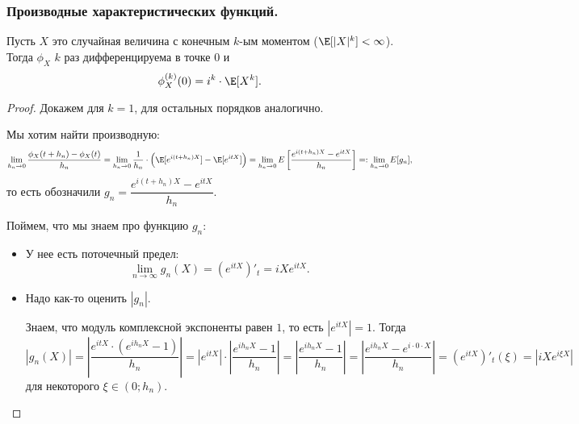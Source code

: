 \subsubsection{Производные характеристических функций.}

\begin{theorem*}
    Пусть $X$ это случайная величина с конечным $k$-ым моментом ($\E[|X|^k] < \infty$). Тогда $\phi_X$ $k$ раз дифференцируема в точке $0$ и
    \begin{equation*}
        \phi_{X}^{(k)}(0) = i^k \cdot \E[X^k].
    \end{equation*}
\end{theorem*}

\begin{proof}
    Докажем для $k = 1$, для остальных порядков аналогично.

    Мы хотим найти производную:
    \begin{align*}
        \lim_{h_n \to 0} \dfrac{\phi_X(t + h_n) - \phi_X(t)}{h_n}
        = \lim_{h_n \to 0} \dfrac{1}{h_n} \cdot \left(\E[e^{i (t + h_n) X}] - \E[e^{itX}]\right)
        = \lim_{h_n \to 0} E \left[\dfrac{e^{i (t + h_n) X} - e^{itX}}{h_n}\right]
        =: \lim_{h_n \to 0} E[g_n],
    \end{align*}
    то есть обозначили $g_n = \dfrac{e^{i (t + h_n) X} - e^{itX}}{h_n}$.

    Поймем, что мы знаем про функцию $g_n$:
    \begin{itemize}
    \item 
        У нее есть поточечный предел:
        \begin{equation*}
            \lim_{n \to \infty} g_n(X) = \left(e^{itX}\right)'_t = iX e^{itX}.
        \end{equation*}

    \item 
        Надо как-то оценить $|g_n|$.

        Знаем, что модуль комплексной экспоненты равен $1$, то есть $|e^{itX}| = 1$. Тогда
        \begin{equation*}
            |g_n(X)| 
            = \left|\dfrac{e^{itX} \cdot (e^{ih_nX} - 1)}{h_n}\right|
            = |e^{itX}| \cdot \left|\dfrac{e^{ih_nX} - 1}{h_n}\right|
            = \left|\dfrac{e^{ih_nX} - 1}{h_n}\right|
            = \left|\dfrac{e^{ih_nX} - e^{i \cdot 0 \cdot X}}{h_n}\right|
            = \left(e^{itX}\right)'_t(\xi)
            = \left|iX e^{i \xi X}\right|
        \end{equation*}
        для некоторого $\xi \in (0; h_n)$.


\end{itemize}
\end{proof}
